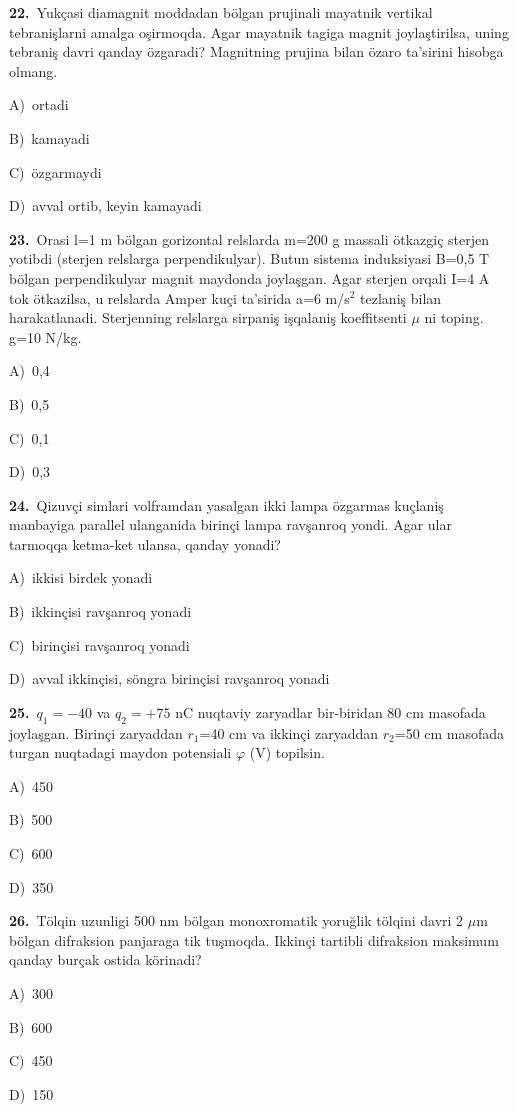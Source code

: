 \documentclass[11pt,a4paper]{article}
\newcommand{\opt}[2]{\hspace*{4mm}#1)\ #2\par}
\begin{document}
\noindent\begin{minipage}{\linewidth}
\textbf{22.}\ Yukçasi diamagnit moddadan bölgan prujinali mayatnik vertikal tebranişlarni amalga oşirmoqda. Agar mayatnik tagiga magnit joylaştirilsa, uning tebraniş davri qanday özgaradi? Magnitning prujina bilan özaro ta’sirini hisobga olmang.\par\smallskip
\opt{A}{ortadi}
\opt{B}{kamayadi}
\opt{C}{özgarmaydi}
\opt{D}{avval ortib, keyin kamayadi}
\end{minipage}\vspace{9pt}\par
\noindent\begin{minipage}{\linewidth}
\textbf{23.}\ Orasi l=1 m bölgan gorizontal relslarda m=200 g massali ötkazgiç sterjen yotibdi (sterjen relslarga perpendikulyar). Butun sistema induksiyasi B=0,5 T bölgan perpendikulyar magnit maydonda joylaşgan. Agar sterjen orqali I=4 A tok ötkazilsa, u relslarda Amper kuçi ta’sirida a=6 m/s$^{2}$ tezlaniş bilan harakatlanadi. Sterjenning relslarga sirpaniş işqalaniş koeffitsenti $\mu$ ni toping. g=10 N/kg.\par\smallskip
\opt{A}{0,4}
\opt{B}{0,5}
\opt{C}{0,1}
\opt{D}{0,3}
\end{minipage}\vspace{9pt}\par
\noindent\begin{minipage}{\linewidth}
\textbf{24.}\ Qizuvçi simlari volframdan yasalgan ikki lampa özgarmas kuçlaniş manbayiga parallel ulanganida birinçi lampa ravşanroq yondi. Agar ular tarmoqqa ketma-ket ulansa, qanday yonadi?\par\smallskip
\opt{A}{ikkisi birdek yonadi}
\opt{B}{ikkinçisi ravşanroq yonadi}
\opt{C}{birinçisi ravşanroq yonadi}
\opt{D}{avval ikkinçisi, söngra birinçisi ravşanroq yonadi}
\end{minipage}\vspace{9pt}\par
\noindent\begin{minipage}{\linewidth}
\textbf{25.}\ $q_1=-40$ va $q_2=+75$ nC nuqtaviy zaryadlar bir-biridan 80 cm masofada joylaşgan. Birinçi zaryaddan $r_1$=40 cm va ikkinçi zaryaddan $r_2$=50 cm masofada turgan nuqtadagi maydon potensiali $\varphi$ (V) topilsin.\par\smallskip
\opt{A}{450}
\opt{B}{500}
\opt{C}{600}
\opt{D}{350}
\end{minipage}\vspace{9pt}\par
\noindent\begin{minipage}{\linewidth}
\textbf{26.}\ Tölqin uzunligi 500 nm bölgan monoxromatik yoruğlik tölqini davri 2 $\mu$m bölgan difraksion panjaraga tik tuşmoqda. Ikkinçi tartibli difraksion maksimum qanday burçak ostida körinadi?\par\smallskip
\opt{A}{300}
\opt{B}{600}
\opt{C}{450}
\opt{D}{150}
\end{minipage}\vspace{9pt}\par
\end{document}
